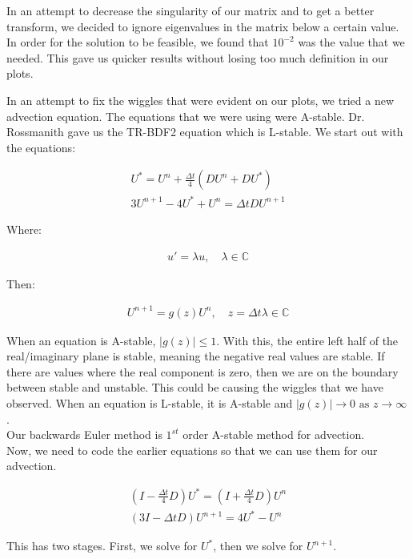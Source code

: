 \documentclass[12pt]{article}
\def \C {\mathbb{C}}
\begin{document}
In an attempt to decrease the singularity of our matrix and to get a better transform, we decided to ignore eigenvalues in the matrix below a certain value. In order for the solution to be feasible, we found that $10^{-2}$ was the value that we needed. This gave us quicker results without losing too much definition in our plots.

In an attempt to fix the wiggles that were evident on our plots, we tried a new advection equation. The equations that we were using were A-stable. Dr. Rossmanith gave us the TR-BDF2 equation which is L-stable. We start out with the equations:

\begin{align*}
U^* = U^n + \frac{\Delta t}{4}(DU^n + DU^*) \\
3U^{n+1} - 4U^* + U^n = \Delta t DU^{n+1}
\end{align*}

Where:

\begin{align*}
u' = \lambda u , \quad \lambda \in \C
\end{align*}

Then:

\begin{align*}
U^{n+1} = g(z)U^n, \quad z = \Delta t \lambda \in \C
\end{align*}

When an equation is A-stable, $|g(z)| \leq 1$. With this, the entire left half of the real/imaginary plane is stable, meaning the negative real values are stable. If there are values where the real component is zero, then we are on the boundary between stable and unstable. This could be causing the wiggles that we have observed. When an equation is L-stable, it is A-stable and $|g(z)| \to 0 \text{ as } z \to \infty$. \\

Our backwards Euler method is $1^{st}$ order A-stable method for advection. \\

Now, we need to code the earlier equations so that we can use them for our advection.

\begin{align*}
\left(I - \frac{\Delta t}{4}D\right)U^* = \left(I + \frac{\Delta t}{4}D\right)U^n \\
(3I - \Delta t D)U^{n+1} = 4U^* - U^n
\end{align*}

This has two stages. First, we solve for $U^*$, then we solve for $U^{n+1}$.
\end{document}
